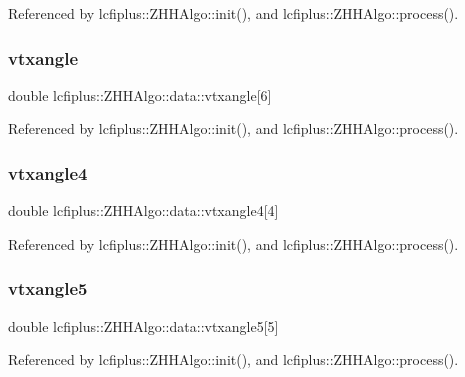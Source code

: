 Referenced by lcfiplus\+::\+Z\+H\+H\+Algo\+::init(), and lcfiplus\+::\+Z\+H\+H\+Algo\+::process().

\mbox{\label{structlcfiplus_1_1ZHHAlgo_1_1data_a149047aa5a268e42b7cfc1bd7b16a67c}} 
\subsubsection{vtxangle}
{\footnotesize\ttfamily double lcfiplus\+::\+Z\+H\+H\+Algo\+::data\+::vtxangle[6]}



Referenced by lcfiplus\+::\+Z\+H\+H\+Algo\+::init(), and lcfiplus\+::\+Z\+H\+H\+Algo\+::process().

\mbox{\label{structlcfiplus_1_1ZHHAlgo_1_1data_a7005d1226edcf4bb93b480b5e25f18b5}} 
\subsubsection{vtxangle4}
{\footnotesize\ttfamily double lcfiplus\+::\+Z\+H\+H\+Algo\+::data\+::vtxangle4[4]}



Referenced by lcfiplus\+::\+Z\+H\+H\+Algo\+::init(), and lcfiplus\+::\+Z\+H\+H\+Algo\+::process().

\mbox{\label{structlcfiplus_1_1ZHHAlgo_1_1data_a11dbc45f5f2a55276ce04521a45ea81b}} 
\subsubsection{vtxangle5}
{\footnotesize\ttfamily double lcfiplus\+::\+Z\+H\+H\+Algo\+::data\+::vtxangle5[5]}



Referenced by lcfiplus\+::\+Z\+H\+H\+Algo\+::init(), and lcfiplus\+::\+Z\+H\+H\+Algo\+::process().

\mbox{\label{structlcfiplus_1_1ZHHAlgo_1_1data_a02f3698bcabc24efe4ce82886e7ff7b5}} 
